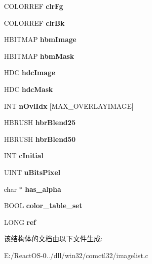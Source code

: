 \begin{DoxyCompactItemize}
C\+O\+L\+O\+R\+R\+EF {\bfseries clr\+Fg}
\item 
\mbox{\label{struct___i_m_a_g_e_l_i_s_t_a5fba8745f507701d1defded596eb7dbb}} 
C\+O\+L\+O\+R\+R\+EF {\bfseries clr\+Bk}
\item 
\mbox{\label{struct___i_m_a_g_e_l_i_s_t_a1dc7d8d9fb6233d69a1ee2df8506f6f8}} 
H\+B\+I\+T\+M\+AP {\bfseries hbm\+Image}
\item 
\mbox{\label{struct___i_m_a_g_e_l_i_s_t_ab9a09522d516fa63ac7562f5a465e530}} 
H\+B\+I\+T\+M\+AP {\bfseries hbm\+Mask}
\item 
\mbox{\label{struct___i_m_a_g_e_l_i_s_t_a99ea0b71c9b4f2ffdcade8e2eb59e116}} 
H\+DC {\bfseries hdc\+Image}
\item 
\mbox{\label{struct___i_m_a_g_e_l_i_s_t_aba03185c3f7ab1a26742fee311c0a918}} 
H\+DC {\bfseries hdc\+Mask}
\item 
\mbox{\label{struct___i_m_a_g_e_l_i_s_t_a6104fd63f3f8199ba0b0a9487844a976}} 
I\+NT {\bfseries n\+Ovl\+Idx} \mbox{[}M\+A\+X\+\_\+\+O\+V\+E\+R\+L\+A\+Y\+I\+M\+A\+GE\mbox{]}
\item 
\mbox{\label{struct___i_m_a_g_e_l_i_s_t_ad04bdd0b3366c4bc05c6e579980b7af9}} 
H\+B\+R\+U\+SH {\bfseries hbr\+Blend25}
\item 
\mbox{\label{struct___i_m_a_g_e_l_i_s_t_a18079a70e81df673da953c7038a6d0e9}} 
H\+B\+R\+U\+SH {\bfseries hbr\+Blend50}
\item 
\mbox{\label{struct___i_m_a_g_e_l_i_s_t_acc174758d46ebb70464f72f01cec3092}} 
I\+NT {\bfseries c\+Initial}
\item 
\mbox{\label{struct___i_m_a_g_e_l_i_s_t_a79045a76b2ac71c198c930722180e8ac}} 
U\+I\+NT {\bfseries u\+Bits\+Pixel}
\item 
\mbox{\label{struct___i_m_a_g_e_l_i_s_t_ac38fd2c76dbd1dcfcf9ef56d94ffc5de}} 
char $\ast$ {\bfseries has\+\_\+alpha}
\item 
\mbox{\label{struct___i_m_a_g_e_l_i_s_t_a7de244a5d7f9ed4157d94067b9f766f9}} 
B\+O\+OL {\bfseries color\+\_\+table\+\_\+set}
\item 
\mbox{\label{struct___i_m_a_g_e_l_i_s_t_aec8f6eb83405aee9ae13a5d3ecef8e86}} 
L\+O\+NG {\bfseries ref}
\end{DoxyCompactItemize}


该结构体的文档由以下文件生成\+:\begin{DoxyCompactItemize}
\item 
E\+:/\+React\+O\+S-\/0../dll/win32/comctl32/imagelist.\+c\end{DoxyCompactItemize}
